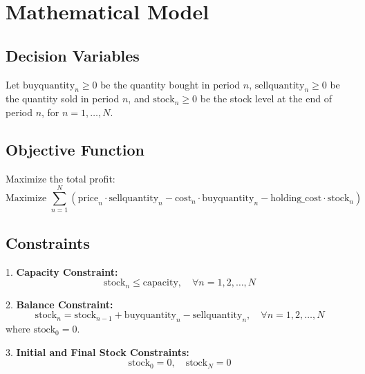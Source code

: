 \documentclass{article}
\begin{document}
\section*{Mathematical Model}

\subsection*{Decision Variables}
Let \( \text{buyquantity}_{n} \geq 0 \) be the quantity bought in period \( n \), \( \text{sellquantity}_{n} \geq 0 \) be the quantity sold in period \( n \), and \( \text{stock}_{n} \geq 0 \) be the stock level at the end of period \( n \), for \( n = 1, \ldots, N \).

\subsection*{Objective Function}
Maximize the total profit:
\[
\text{Maximize } \sum_{n=1}^{N} \left( \text{price}_{n} \cdot \text{sellquantity}_{n} - \text{cost}_{n} \cdot \text{buyquantity}_{n} - \text{holding\_cost} \cdot \text{stock}_{n} \right)
\]

\subsection*{Constraints}
1. \textbf{Capacity Constraint:}
\[ 
\text{stock}_{n} \leq \text{capacity}, \quad \forall n = 1, 2, \ldots, N 
\]

2. \textbf{Balance Constraint:}
\[
\text{stock}_{n} = \text{stock}_{n-1} + \text{buyquantity}_{n} - \text{sellquantity}_{n}, \quad \forall n = 1, 2, \ldots, N
\]
where \( \text{stock}_{0} = 0 \).

3. \textbf{Initial and Final Stock Constraints:}
\[
\text{stock}_{0} = 0, \quad \text{stock}_{N} = 0
\]
\end{document}
